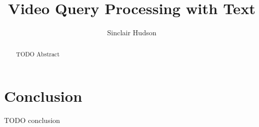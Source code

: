 \documentclass{article}
\title{Video Query Processing with Text}
\author{Sinclair Hudson}
\begin{document}
\maketitle

\begin{abstract}
      TODO Abstract
\end{abstract}













\section{Conclusion}
TODO conclusion



\end{document}
